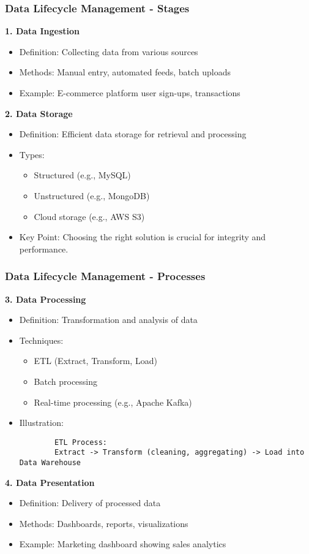 \documentclass[aspectratio=169]{beamer}
\begin{document}
\begin{frame}[fragile]
    \frametitle{Data Lifecycle Management - Stages}
    \textbf{1. Data Ingestion}
    \begin{itemize}
        \item Definition: Collecting data from various sources
        \item Methods: Manual entry, automated feeds, batch uploads
        \item Example: E-commerce platform user sign-ups, transactions
    \end{itemize}
    
    \textbf{2. Data Storage}
    \begin{itemize}
        \item Definition: Efficient data storage for retrieval and processing
        \item Types: 
            \begin{itemize}
                \item Structured (e.g., MySQL)
                \item Unstructured (e.g., MongoDB)
                \item Cloud storage (e.g., AWS S3)
            \end{itemize}
        \item Key Point: Choosing the right solution is crucial for integrity and performance.
    \end{itemize}
\end{frame}

\begin{frame}[fragile]
    \frametitle{Data Lifecycle Management - Processes}
    \textbf{3. Data Processing}
    \begin{itemize}
        \item Definition: Transformation and analysis of data
        \item Techniques:
            \begin{itemize}
                \item ETL (Extract, Transform, Load)
                \item Batch processing
                \item Real-time processing (e.g., Apache Kafka) 
            \end{itemize}
        \item Illustration:
        \begin{lstlisting}
        ETL Process:
        Extract -> Transform (cleaning, aggregating) -> Load into Data Warehouse
        \end{lstlisting}
    \end{itemize}

    \textbf{4. Data Presentation}
    \begin{itemize}
        \item Definition: Delivery of processed data
        \item Methods: Dashboards, reports, visualizations
        \item Example: Marketing dashboard showing sales analytics
    \end{itemize}
\end{frame}
\end{document}
